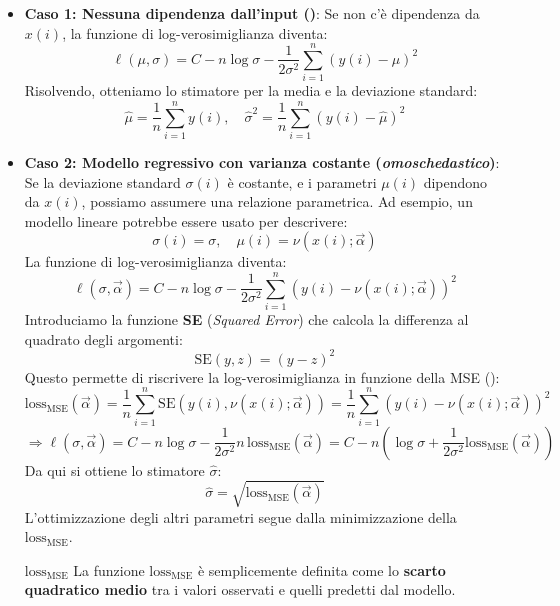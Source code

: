 \begin{itemize}
    \item \textbf{Caso 1: Nessuna dipendenza dall'input ()}: Se non c'è dipendenza da \( x(i) \), la funzione di log-verosimiglianza diventa:
        \[
            \ell(\mu, \sigma) = C - n \log \sigma - \frac{1}{2\sigma^2} \sum_{i=1}^n (y(i) - \mu)^2
        \]
        Risolvendo, otteniamo lo stimatore per la media e la deviazione standard:
        \[
            \hat{\mu} = \frac{1}{n} \sum_{i=1}^n y(i), \quad \hat{\sigma}^2 = \frac{1}{n} \sum_{i=1}^n (y(i) - \hat{\mu})^2
        \]

    \item \textbf{Caso 2: Modello regressivo con varianza costante (\textit{omoschedastico})}: Se la deviazione standard \( \sigma(i) \) è costante, e i parametri \( \mu(i) \) dipendono da \( x(i) \), possiamo assumere una relazione parametrica. Ad esempio, un modello lineare potrebbe essere usato per descrivere:
        \[
            \sigma(i) = \sigma, \quad \mu(i) = \nu(x(i); \vec{\alpha})
        \]
        La funzione di log-verosimiglianza diventa:
        \[
            \ell(\sigma, \vec{\alpha}) = C - n \log \sigma - \frac{1}{2\sigma^2} \sum_{i=1}^n (y(i) - \nu(x(i); \vec{\alpha}))^2
        \]
        Introduciamo la funzione \textbf{SE} (\textit{Squared Error}) che calcola la differenza al quadrato degli argomenti:
        \[
            \mathrm{SE}(y, z) = (y - z)^2
        \]
        Questo permette di riscrivere la log-verosimiglianza in funzione della
        MSE ():
        \[
            \mathrm{loss}_{\text{MSE}}(\vec{\alpha}) = \frac{1}{n} \sum_{i=1}^n \mathrm{SE}(y(i), \nu(x(i); \vec{\alpha})) = \frac{1}{n} \sum_{i=1}^n (y(i) - \nu(x(i); \vec{\alpha}))^2
        \]
        \[
            \Rightarrow \ell(\sigma, \vec{\alpha}) = C - n \log \sigma - \frac{1}{2\sigma^2}
            n\,\mathrm{loss}_{\text{MSE}}(\vec{\alpha})
            = C - n (\log \sigma + \frac{1}{2\sigma^2}
            \mathrm{loss}_{\text{MSE}}(\vec{\alpha}))
        \]
        Da qui si ottiene lo stimatore \( \hat{\sigma} \):
        \[
            \hat{\sigma} = \sqrt{\mathrm{loss}_{\text{MSE}}(\vec{\alpha})}
        \]
        L'ottimizzazione degli altri parametri segue dalla minimizzazione della
        \( \mathrm{loss}_{\text{MSE}} \).

        \begin{nota}{$\mathrm{loss_{MSE}}$}{}
            La funzione $\mathrm{loss_{MSE}}$ è semplicemente definita come lo
            \textbf{scarto quadratico medio} tra i valori osservati e quelli
            predetti dal modello.
        \end{nota}


\end{itemize}
